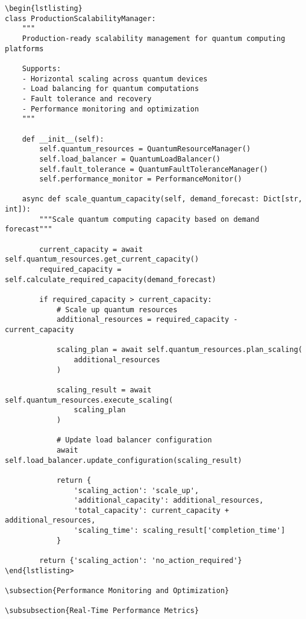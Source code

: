\documentclass[12pt,a4paper]{report}
\begin{document}
\begin{lstlisting}
\begin{lstlisting}
class ProductionScalabilityManager:
    """
    Production-ready scalability management for quantum computing platforms

    Supports:
    - Horizontal scaling across quantum devices
    - Load balancing for quantum computations
    - Fault tolerance and recovery
    - Performance monitoring and optimization
    """

    def __init__(self):
        self.quantum_resources = QuantumResourceManager()
        self.load_balancer = QuantumLoadBalancer()
        self.fault_tolerance = QuantumFaultToleranceManager()
        self.performance_monitor = PerformanceMonitor()

    async def scale_quantum_capacity(self, demand_forecast: Dict[str, int]):
        """Scale quantum computing capacity based on demand forecast"""

        current_capacity = await self.quantum_resources.get_current_capacity()
        required_capacity = self.calculate_required_capacity(demand_forecast)

        if required_capacity > current_capacity:
            # Scale up quantum resources
            additional_resources = required_capacity - current_capacity

            scaling_plan = await self.quantum_resources.plan_scaling(
                additional_resources
            )

            scaling_result = await self.quantum_resources.execute_scaling(
                scaling_plan
            )

            # Update load balancer configuration
            await self.load_balancer.update_configuration(scaling_result)

            return {
                'scaling_action': 'scale_up',
                'additional_capacity': additional_resources,
                'total_capacity': current_capacity + additional_resources,
                'scaling_time': scaling_result['completion_time']
            }

        return {'scaling_action': 'no_action_required'}
\end{lstlisting>

\subsection{Performance Monitoring and Optimization}

\subsubsection{Real-Time Performance Metrics}


\end{lstlisting}
\end{document}
